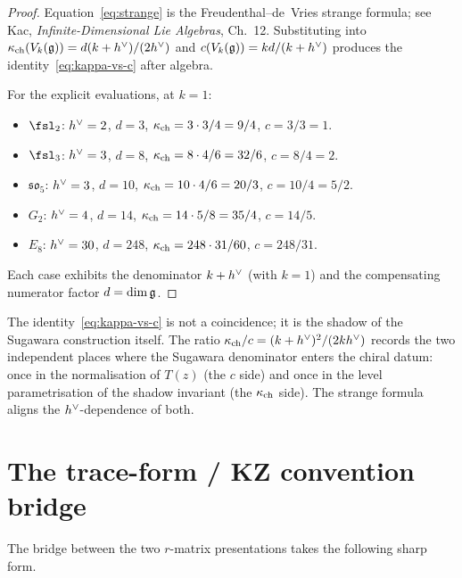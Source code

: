 \begin{proof}
Equation~\eqref{eq:strange} is the Freudenthal--de~Vries strange
formula; see Kac, \emph{Infinite-Dimensional Lie Algebras},
Ch.~12. Substituting into
$\kappa_{\mathrm{ch}}(V_k(\mathfrak{g})) = d(k + h^{\vee})/(2h^{\vee})$ and
$c(V_k(\mathfrak{g})) = kd/(k + h^{\vee})$ produces the identity~\eqref{eq:kappa-vs-c}
after algebra.

For the explicit evaluations, at $k = 1$:
\begin{itemize}
 \item $\fsl_2$: $h^{\vee} = 2$, $d = 3$, $\kappa_{\mathrm{ch}} = 3 \cdot 3 / 4 = 9/4$,
 $c = 3/3 = 1$.
 \item $\fsl_3$: $h^{\vee} = 3$, $d = 8$, $\kappa_{\mathrm{ch}} = 8 \cdot 4 / 6 = 32/6$,
 $c = 8/4 = 2$.
 \item $\mathfrak{so}_5$: $h^{\vee} = 3$, $d = 10$,
 $\kappa_{\mathrm{ch}} = 10 \cdot 4 / 6 = 20/3$, $c = 10/4 = 5/2$.
 \item $G_2$: $h^{\vee} = 4$, $d = 14$,
 $\kappa_{\mathrm{ch}} = 14 \cdot 5 / 8 = 35/4$, $c = 14/5$.
 \item $E_8$: $h^{\vee} = 30$, $d = 248$,
 $\kappa_{\mathrm{ch}} = 248 \cdot 31 / 60$, $c = 248/31$.
\end{itemize}
Each case exhibits the denominator $k + h^{\vee}$ (with $k = 1$) and the
compensating numerator factor $d = \dim\mathfrak{g}$.
\end{proof}

\begin{remark}
\label{rem:strange-formula-reading}
The identity~\eqref{eq:kappa-vs-c} is not a coincidence; it is the
shadow of the Sugawara construction itself. The ratio
$\kappa_{\mathrm{ch}}/c = (k + h^{\vee})^2/(2kh^{\vee})$ records the two independent places
where the Sugawara denominator enters the chiral datum: once in the
normalisation of $T(z)$ (the $c$ side) and once in the level
parametrisation of the shadow invariant (the $\kappa_{\mathrm{ch}}$ side). The strange
formula aligns the $h^{\vee}$-dependence of both.
\end{remark}

\section{The trace-form / KZ convention bridge}
\label{sec:bridge}

The bridge between the two $r$-matrix presentations takes the
following sharp form.

